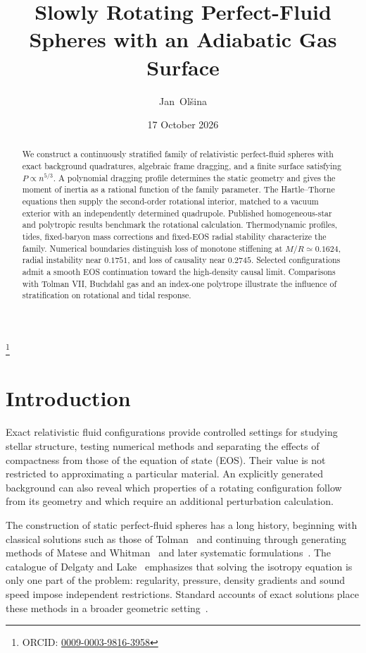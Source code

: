 \documentclass[aps,prd,reprint,a4paper,nofootinbib,floatfix]{revtex4-2}
\begin{document}
\title{Slowly Rotating Perfect-Fluid Spheres with an Adiabatic Gas Surface}
\author{Jan~Ol\v{s}ina}
\thanks{ORCID: \href{https://orcid.org/0009-0003-9816-3958}{0009-0003-9816-3958}}
\date{17 October 2026}
\begin{abstract}
We construct a continuously stratified family of relativistic perfect-fluid spheres with exact background quadratures, algebraic frame dragging, and a finite surface satisfying $P\propto n^{5/3}$. A polynomial dragging profile determines the static geometry and gives the moment of inertia as a rational function of the family parameter. The Hartle--Thorne equations then supply the second-order rotational interior, matched to a vacuum exterior with an independently determined quadrupole. Published homogeneous-star and polytropic results benchmark the rotational calculation. Thermodynamic profiles, tides, fixed-baryon mass corrections and fixed-EOS radial stability characterize the family. Numerical boundaries distinguish loss of monotone stiffening at $M/R\simeq0.1624$, radial instability near $0.1751$, and loss of causality near $0.2745$. Selected configurations admit a smooth EOS continuation toward the high-density causal limit. Comparisons with Tolman VII, Buchdahl gas and an index-one polytrope illustrate the influence of stratification on rotational and tidal response.
\end{abstract}
\maketitle


\section{Introduction}
Exact relativistic fluid configurations provide controlled settings for studying stellar structure, testing numerical methods and separating the effects of compactness from those of the equation of state (EOS). Their value is not restricted to approximating a particular material. An explicitly generated background can also reveal which properties of a rotating configuration follow from its geometry and which require an additional perturbation calculation.

The construction of static perfect-fluid spheres has a long history, beginning with classical solutions such as those of Tolman~\cite{tolman} and continuing through generating methods of Matese and Whitman~\cite{matesewhitman} and later systematic formulations~\cite{lake,martin,rahman,boonserm}. The catalogue of Delgaty and Lake~\cite{delgaty} emphasizes that solving the isotropy equation is only one part of the problem: regularity, pressure, density gradients and sound speed impose independent restrictions. Standard accounts of exact solutions place these methods in a broader geometric setting~\cite{stephani}.
\end{document}

